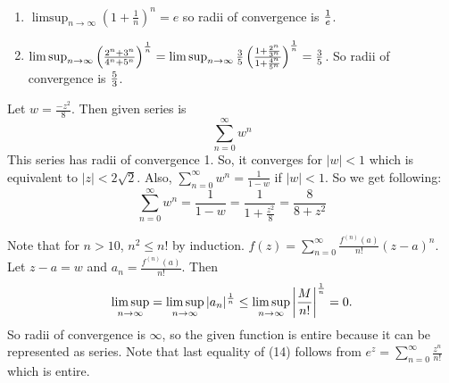 \begin{problem}
	\hfill
	\begin{enumerate}[label = (\alph*)]
		\item $\limsup_{n \rightarrow \infty} \left( 1+ \frac{1}{n} \right)^n = e$ so radii of convergence is $1 \over e$.
		\item $\limsup_{n \rightarrow \infty} \left ( \frac{2^n + 3^n}{4^n + 5^n} \right ) ^{1 \over n} = \limsup_{n\rightarrow \infty} \frac{3}{5} \left( \frac{1 + \frac{2^n}{3^n}}{1+\frac{4^n}{5^n}} \right)^{1 \over n} = {3 \over 5}$. So radii of convergence is ${5 \over 3}$.
	\end{enumerate}
\end{problem}

\begin{problem}
	Let $w = \frac{-z^2}{8}$. Then given series is
	\begin{equation}
		\sum_{n=0}^{\infty}w^n
		\label{<+label+>}
	\end{equation}
	This series has radii of convergence 1. So, it converges for $|w| < 1$ which is equivalent to $|z| < 2 \sqrt{2}$.
	Also, $\sum_{n=0}^{\infty}w^n = \frac{1}{1-w}$ if $|w| < 1$. So we get following:
	\begin{equation}
		\sum_{n=0}^{\infty} w^n = \frac{1}{1-w} = \frac{1}{1 + \frac{z^2}{8}} = \frac{8}{8+z^2}
		\label{<+label+>}
	\end{equation}
\end{problem}

\begin{problem}
	Note that for $n > 10$, $n^2 \leq n!$ by induction. $f(z) = \sum_{n=0}^{\infty} \frac{f^{(n)}(a)}{n!}\left( z-a \right)^{n}$. Let $z-a = w$ and $a_n = \frac{f^{(n)}(a)}{n!}$. Then
	\begin{equation}
		\limsup_{n\rightarrow \infty} = \limsup_{n\rightarrow \infty} |a_n|^{1 \over n} \leq \limsup_{n\rightarrow \infty} \left | {M \over n!} \right | ^{1 \over n} = 0.
		\label{14}
	\end{equation}
	So radii of convergence is $\infty$, so the given function is entire because it can be represented as series.
	Note that last equality of (14) follows from $e^z = \sum_{n=0}^{\infty} \frac{z^n}{n!}$ which is entire.
\end{problem}
